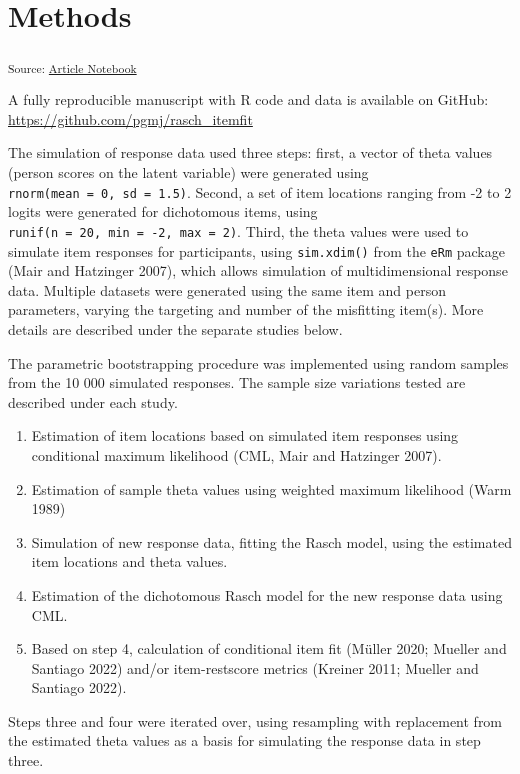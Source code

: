 \documentclass[
  letterpaper,
  DIV=11,
  numbers=noendperiod]{scrartcl}
\providecommand{\tightlist}{%
  \setlength{\itemsep}{0pt}\setlength{\parskip}{0pt}}\usepackage{longtable,booktabs,array}
\begin{document}
\section{Methods}\label{methods}

\textsubscript{Source:
\href{https://pgmj.github.io/rasch_itemfit/index.qmd.html}{Article
Notebook}}

A fully reproducible manuscript with R code and data is available on
GitHub: \url{https://github.com/pgmj/rasch_itemfit}

The simulation of response data used three steps: first, a vector of
theta values (person scores on the latent variable) were generated using
\texttt{rnorm(mean\ =\ 0,\ sd\ =\ 1.5)}. Second, a set of item locations
ranging from -2 to 2 logits were generated for dichotomous items, using
\texttt{runif(n\ =\ 20,\ min\ =\ -2,\ max\ =\ 2)}. Third, the theta
values were used to simulate item responses for participants, using
\texttt{sim.xdim()} from the \texttt{eRm} package (Mair and Hatzinger
2007), which allows simulation of multidimensional response data.
Multiple datasets were generated using the same item and person
parameters, varying the targeting and number of the misfitting item(s).
More details are described under the separate studies below.

The parametric bootstrapping procedure was implemented using random
samples from the 10 000 simulated responses. The sample size variations
tested are described under each study.

\begin{enumerate}
\def\labelenumi{\arabic{enumi}.}
\tightlist
\item
  Estimation of item locations based on simulated item responses using
  conditional maximum likelihood (CML, Mair and Hatzinger 2007).
\item
  Estimation of sample theta values using weighted maximum likelihood
  (Warm 1989)
\item
  Simulation of new response data, fitting the Rasch model, using the
  estimated item locations and theta values.
\item
  Estimation of the dichotomous Rasch model for the new response data
  using CML.
\item
  Based on step 4, calculation of conditional item fit (Müller 2020;
  Mueller and Santiago 2022) and/or item-restscore metrics (Kreiner
  2011; Mueller and Santiago 2022).
\end{enumerate}

Steps three and four were iterated over, using resampling with
replacement from the estimated theta values as a basis for simulating
the response data in step three.
\end{document}
